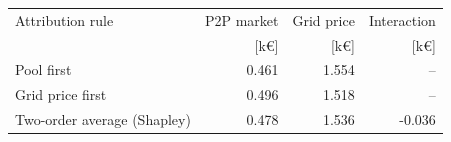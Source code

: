 \begin{tabular*}{\textwidth}{@{\extracolsep{\fill}}lrrr@{}}
\toprule
Attribution rule & P2P market & Grid price & Interaction \\
 & [k\euro] & [k\euro] & [k\euro] \\
\midrule
Pool first & 0.461 & 1.554 & -- \\
Grid price first & 0.496 & 1.518 & -- \\
Two-order average (Shapley) & 0.478 & 1.536 & -0.036 \\
\bottomrule
\end{tabular*}
